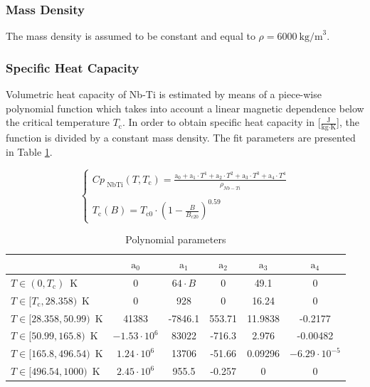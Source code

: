 
\subsubsection{Mass Density}
The mass density is assumed to be constant and equal to $\rho = 6000~\text{kg/m}^{3}$.

\subsubsection{Specific Heat Capacity}
Volumetric heat capacity of Nb-Ti is estimated by means of a piece-wise polynomial function which takes into account a linear magnetic dependence below the critical temperature $T_\text{c}$. In order to obtain specific heat capacity in [$\frac{\text{J}}{\text{kg} \cdot \text{K}}$], the function is divided by a constant mass density. The fit parameters are presented in Table \ref{table:nbti_parameters}.

\begin{equation}
    \left\{ \begin{array}{ll}
    Cp_\text{ NbTi}(T, T_\text{c}) = \frac{\text{a}_0 + \text{a}_1\cdot T^{1} + \text{a}_2\cdot T^{2} + \text{a}_3\cdot T^{3}+ \text{a}_4\cdot T^{4}} {\rho_{Nb-Ti}} \\ \\
    T_\text{c}(B) = T_\text{c0}\cdot(1-\frac{B}{B_\text{c20}})^{0.59}
    \end{array} \right.
\end{equation}

\begin{table}[h!]
    \caption{Polynomial parameters} 
    \vspace{-1.em} 
    \fontsize{10}{10}
    \selectfont 
    \renewcommand{\arraystretch}{1.5}
    \begin{center}
    \begin{tabular}{ lccccc }  
    \hline
    & $\text{a}_0$ & $\text{a}_1$ & $\text{a}_2$ & $\text{a}_3$ & $\text{a}_4$ \\
    \hline
    $T \in (0, T_\text{c})$~K & 0 & $64 \cdot B$ & 0 & 49.1 & 0 \\        
    $T \in [T_\text{c}, 28.358)$~K & 0 & 928 & 0 & 16.24 & 0 \\        
    $T \in [28.358, 50.99)$~K & 41383 & -7846.1 & 553.71 & 11.9838 & -0.2177 \\        
    $T \in [50.99, 165.8)$~K & $-1.53\cdot10^{6}$ & 83022 & -716.3 & 2.976 & -0.00482 \\ 
    $T \in [165.8, 496.54)$~K & $1.24\cdot10^{6}$ & 13706 & -51.66 & 0.09296 & $-6.29\cdot10^{-5}$ \\        
    $T \in [496.54, 1000)$~K & $2.45\cdot10^{6}$ & 955.5 & -0.257 & 0 & 0 \\       
    \hline
     \end{tabular} 
    \end{center}  
     \label{table:nbti_parameters} 
 \end{table}
 
